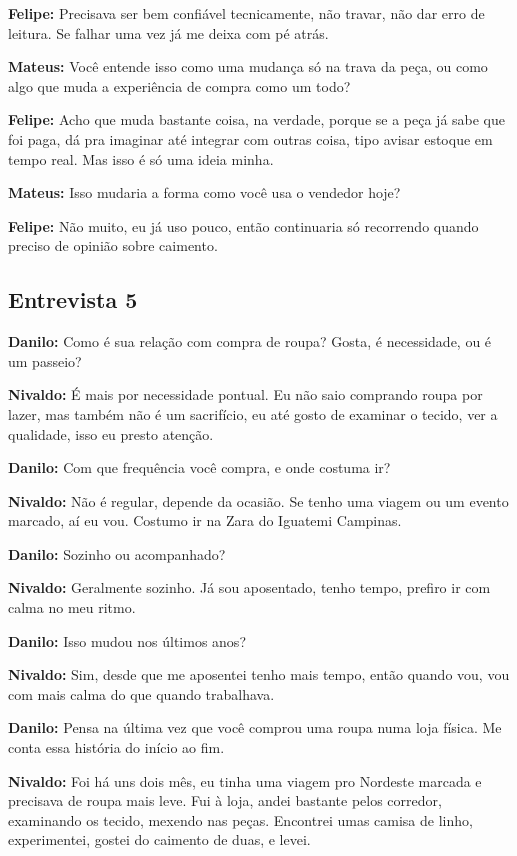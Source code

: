 \textbf{Felipe:} Precisava ser bem confiável tecnicamente, não travar, não dar erro de leitura. Se falhar uma vez já me deixa com pé atrás.

\textbf{Mateus:} Você entende isso como uma mudança só na trava da peça, ou como algo que muda a experiência de compra como um todo?

\textbf{Felipe:} Acho que muda bastante coisa, na verdade, porque se a peça já sabe que foi paga, dá pra imaginar até integrar com outras coisa, tipo avisar estoque em tempo real. Mas isso é só uma ideia minha.

\textbf{Mateus:} Isso mudaria a forma como você usa o vendedor hoje?

\textbf{Felipe:} Não muito, eu já uso pouco, então continuaria só recorrendo quando preciso de opinião sobre caimento.


\subsection*{Entrevista 5}

\textbf{Danilo:} Como é sua relação com compra de roupa? Gosta, é necessidade, ou é um passeio?

\textbf{Nivaldo:} É mais por necessidade pontual. Eu não saio comprando roupa por lazer, mas também não é um sacrifício, eu até gosto de examinar o tecido, ver a qualidade, isso eu presto atenção.

\textbf{Danilo:} Com que frequência você compra, e onde costuma ir?

\textbf{Nivaldo:} Não é regular, depende da ocasião. Se tenho uma viagem ou um evento marcado, aí eu vou. Costumo ir na Zara do Iguatemi Campinas.

\textbf{Danilo:} Sozinho ou acompanhado?

\textbf{Nivaldo:} Geralmente sozinho. Já sou aposentado, tenho tempo, prefiro ir com calma no meu ritmo.

\textbf{Danilo:} Isso mudou nos últimos anos?

\textbf{Nivaldo:} Sim, desde que me aposentei tenho mais tempo, então quando vou, vou com mais calma do que quando trabalhava.

\textbf{Danilo:} Pensa na última vez que você comprou uma roupa numa loja física. Me conta essa história do início ao fim.

\textbf{Nivaldo:} Foi há uns dois mês, eu tinha uma viagem pro Nordeste marcada e precisava de roupa mais leve. Fui à loja, andei bastante pelos corredor, examinando os tecido, mexendo nas peças. Encontrei umas camisa de linho, experimentei, gostei do caimento de duas, e levei.

